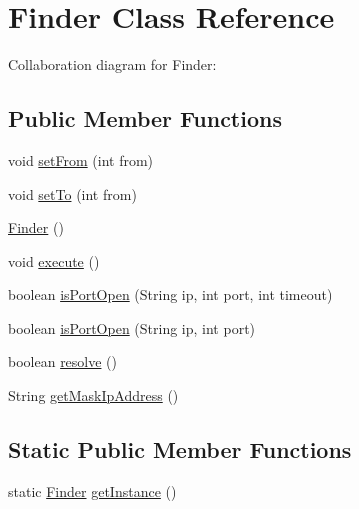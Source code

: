 \hypertarget{classcom_1_1axcoto_1_1shinjuku_1_1maki_1_1_finder}{\section{\-Finder \-Class \-Reference}
\label{classcom_1_1axcoto_1_1shinjuku_1_1maki_1_1_finder}
}


\-Collaboration diagram for \-Finder\-:
\subsection*{\-Public \-Member \-Functions}
\begin{DoxyCompactItemize}
\item 
void \hyperlink{classcom_1_1axcoto_1_1shinjuku_1_1maki_1_1_finder_a49ffc085cf38e2ad7c45353ee3b9feed}{set\-From} (int from)
\item 
void \hyperlink{classcom_1_1axcoto_1_1shinjuku_1_1maki_1_1_finder_ac20a9d887e68e59cd55f0e06e8adc3d5}{set\-To} (int from)
\item 
\hyperlink{classcom_1_1axcoto_1_1shinjuku_1_1maki_1_1_finder_a4194bb7a4c7f2a95f023574720bd9449}{\-Finder} ()
\item 
void \hyperlink{classcom_1_1axcoto_1_1shinjuku_1_1maki_1_1_finder_a61af3e60b94ae3e748f6fbac1e794af7}{execute} ()
\item 
boolean \hyperlink{classcom_1_1axcoto_1_1shinjuku_1_1maki_1_1_finder_a91536df7fdfdc1c387e35b5698ca874d}{is\-Port\-Open} (\-String ip, int port, int timeout)
\item 
boolean \hyperlink{classcom_1_1axcoto_1_1shinjuku_1_1maki_1_1_finder_ae7211c94c54be43ddd7913b8cfd04516}{is\-Port\-Open} (\-String ip, int port)
\item 
boolean \hyperlink{classcom_1_1axcoto_1_1shinjuku_1_1maki_1_1_finder_a49ecfb0ff5a157d06a36e921de9668d6}{resolve} ()
\item 
\-String \hyperlink{classcom_1_1axcoto_1_1shinjuku_1_1maki_1_1_finder_a7e0964244cc53921efceee777fd8b890}{get\-Mask\-Ip\-Address} ()
\end{DoxyCompactItemize}
\subsection*{\-Static \-Public \-Member \-Functions}
\begin{DoxyCompactItemize}
\item 
static \hyperlink{classcom_1_1axcoto_1_1shinjuku_1_1maki_1_1_finder}{\-Finder} \hyperlink{classcom_1_1axcoto_1_1shinjuku_1_1maki_1_1_finder_a974c36d832f8688c6d2073839a601eda}{get\-Instance} ()
\end{DoxyCompactItemize}
